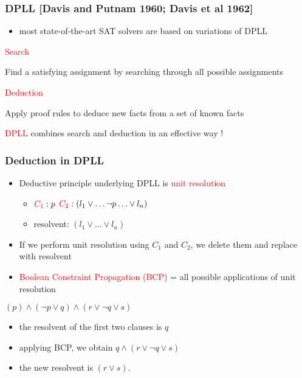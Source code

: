 \documentclass[smaller]{beamer}
\newcommand{\red}[1]{\textcolor{red}{#1}}
\begin{document}
\begin{frame}
\frametitle{DPLL [Davis and Putnam 1960; Davis et al 1962]}
\begin{itemize}
\item most state-of-the-art SAT solvers are based on variations of DPLL 
\end{itemize}

\vspace{2mm}
\red{Search}

\vspace{2mm}
Find a satisfying assignment by searching through all possible assignments

\vspace{2mm}
\red{Deduction}

\vspace{2mm}
Apply proof rules to deduce new facts from a set of known facts

\vspace{6mm}
\red{DPLL} combines search and deduction in an effective way !

\end{frame}

\begin{frame}
\frametitle{Deduction in DPLL}
\begin{itemize}
\setlength\itemsep{2mm}
\item Deductive principle underlying DPLL is \red{unit resolution}
\vspace{4mm}
\begin{itemize}
	\setlength\itemsep{2mm}
	\item $\red{C_1}: p$\hspace{2cm} $\red{C_2}: (l_1\vee\ldots \neg p\ldots \vee l_n)$
	\item resolvent: $(l_1\vee\ldots\vee l_n)$
\end{itemize}
\item If we perform unit resolution using $C_1$ and $C_2$, we delete them and replace with
resolvent
\item \red{Boolean Constraint Propagation (BCP)} = all possible applications of unit resolution
\end{itemize}

\begin{example}
\vspace{1mm}
\begin{center}
$
(p)\land (\neg p\vee q)\land (r\vee \neg q\vee s)
$
\end{center}
\begin{itemize}
\item the resolvent of the first two clauses is $q$
\item applying BCP, we obtain $q\land (r\vee \neg q\vee s)$
\item the new resolvent is $(r\vee s)$.
\end{itemize}
\end{example}
\end{frame}
\end{document}
